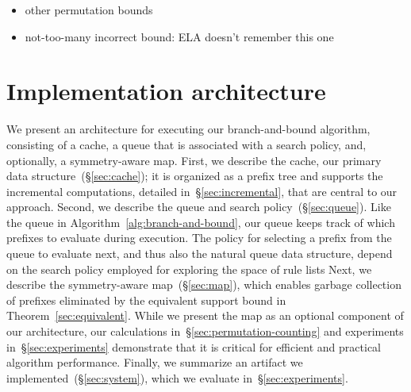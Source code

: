 \begin{itemize}
\item other permutation bounds
\item not-too-many incorrect bound:  ELA doesn't remember this one
\end{itemize}







\section{Implementation architecture}

We present an architecture for executing our branch-and-bound algorithm,
consisting of a cache, a queue that is associated with a search policy,
and, optionally, a symmetry-aware map.
%
First, we describe the cache, our primary data structure~(\S\ref{sec:cache});
it is organized as a prefix tree and supports the incremental computations,
detailed in~\S\ref{sec:incremental}, that are central to our approach.
%
Second, we describe the queue and search policy~(\S\ref{sec:queue}).
%
Like the queue in Algorithm~\ref{alg:branch-and-bound},
our queue keeps track of which prefixes to evaluate during execution.
%
The policy for selecting a prefix from the queue to evaluate next,
and thus also the natural queue data structure, depend on
the search policy employed for exploring the space of rule lists
%
Next, we describe the symmetry-aware map~(\S\ref{sec:map}),
which enables garbage collection of prefixes eliminated by the
equivalent support bound in Theorem~\ref{sec:equivalent}.
%
While we present the map as an optional component of our architecture,
our calculations in~\S\ref{sec:permutation-counting}
and experiments in~\S\ref{sec:experiments} demonstrate that
it is critical for efficient and practical algorithm performance.
%
Finally, we summarize an artifact we implemented~(\S\ref{sec:system}),
which we evaluate in~\S\ref{sec:experiments}.

